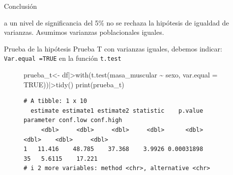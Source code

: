 \documentclass[
  ignorenonframetext,
]{beamer}
\newenvironment{Shaded}{\begin{snugshade}}{\end{snugshade}}
\newcommand{\AttributeTok}[1]{\textcolor[rgb]{0.40,0.45,0.13}{#1}}
\newcommand{\ConstantTok}[1]{\textcolor[rgb]{0.56,0.35,0.01}{#1}}
\newcommand{\FunctionTok}[1]{\textcolor[rgb]{0.28,0.35,0.67}{#1}}
\newcommand{\NormalTok}[1]{\textcolor[rgb]{0.00,0.23,0.31}{#1}}
\newcommand{\OtherTok}[1]{\textcolor[rgb]{0.00,0.23,0.31}{#1}}
\newcommand{\SpecialCharTok}[1]{\textcolor[rgb]{0.37,0.37,0.37}{#1}}
\begin{document}
\begin{frame}{Conclusión}
\label{conclusiuxf3n}
\begin{tcolorbox}[enhanced jigsaw, colbacktitle=quarto-callout-note-color!10!white, coltitle=black, title=\textcolor{quarto-callout-note-color}{\faInfo}\hspace{0.5em}{Note}, breakable, bottomrule=.15mm, colback=white, toprule=.15mm, bottomtitle=1mm, toptitle=1mm, titlerule=0mm, rightrule=.15mm, arc=.35mm, leftrule=.75mm, colframe=quarto-callout-note-color-frame, opacitybacktitle=0.6, left=2mm, opacityback=0]

a un nivel de significancia del 5\% no se rechaza la hipótesis de
igualdad de varianzas. Asumimos varianzas poblacionales iguales.

\end{tcolorbox}
\end{frame}

\begin{frame}[fragile]{Prueba de la hipótesis}
\label{prueba-de-la-hipuxf3tesis-1}
Prueba T con varianzas iguales, debemos indicar:
\texttt{Var.equal\ =TRUE} en la función \texttt{t.test}

\begin{figure}

\begin{Shaded}
\begin{Highlighting}[]
\NormalTok{prueba\_t}\OtherTok{\textless{}{-}}\NormalTok{ df}\SpecialCharTok{|\textgreater{}}\FunctionTok{with}\NormalTok{(}\FunctionTok{t.test}\NormalTok{(masa\_muscular }\SpecialCharTok{\textasciitilde{}}\NormalTok{ sexo, }\AttributeTok{var.equal =} \ConstantTok{TRUE}\NormalTok{))}\SpecialCharTok{|\textgreater{}}\FunctionTok{tidy}\NormalTok{()}
\FunctionTok{print}\NormalTok{(prueba\_t) }
\end{Highlighting}
\end{Shaded}

\begin{verbatim}
# A tibble: 1 x 10
  estimate estimate1 estimate2 statistic    p.value parameter conf.low conf.high
     <dbl>     <dbl>     <dbl>     <dbl>      <dbl>     <dbl>    <dbl>     <dbl>
1   11.416    48.785    37.368    3.9926 0.00031898        35   5.6115    17.221
# i 2 more variables: method <chr>, alternative <chr>
\end{verbatim}

\end{figure}%
\end{frame}
\end{document}
